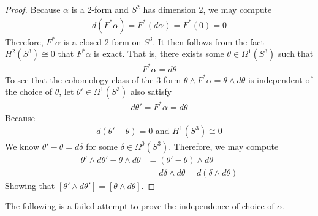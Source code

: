 \documentclass{report}
\begin{document}
\begin{proof}
Because $\alpha $ is a 2-form and $S^2$ has dimension  2, we may compute   
\begin{align*}
  d(F^* \alpha )= F^* (d\alpha )=F^*(0)=0
\end{align*}
Therefore, $F^* \alpha $ is a closed 2-form on $S^3$. It then follows from the fact $H^2(S^3)\cong 0$ that $F^*\alpha $ is exact. That is, there exists some $\theta \in \Omega^1(S^3)$ such that 
\begin{align*}
F^* \alpha = d\theta
\end{align*} 
To see that the cohomology class of the 3-form $\theta \wedge  F^* \alpha = \theta \wedge  d\theta  $ is independent of the choice of $\theta$, let $\theta' \in \Omega^1 (S^3)$ also satisfy 
\begin{align*}
d\theta ' = F^* \alpha = d \theta 
\end{align*}
Because 
\begin{align*}
d(\theta' -\theta )=0 \text{ and }H^1(S^3)\cong 0 
\end{align*}
We know $\theta'- \theta = d \delta $ for some $\delta \in \Omega^0 (S^3)$. Therefore, we may compute
\begin{align*}
\theta' \wedge  d\theta' - \theta \wedge  d\theta  &= (\theta ' - \theta ) \wedge  d \theta   \\
&=d\delta \wedge  d\theta = d(\delta \wedge  d \theta ) 
\end{align*}
Showing that $[\theta ' \wedge  d \theta' ]= [\theta \wedge  d\theta ]$. 
\end{proof}
\begin{mdframed}
The following is a failed attempt to prove the independence of choice of $\alpha $. 
\end{mdframed}
\end{document}
